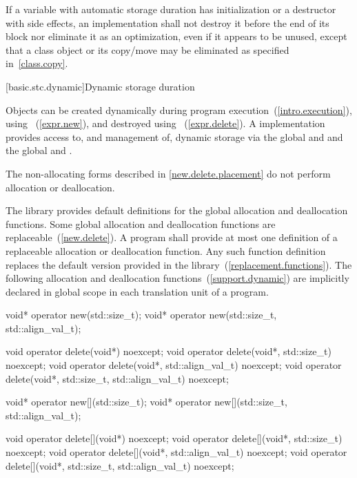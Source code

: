 \pnum
If a variable with automatic storage duration has initialization or a destructor with side
effects, an implementation shall not destroy it before the end of its block
nor eliminate it as an optimization, even if it appears to be
unused, except that a class object or its copy/move may be eliminated as
specified in~\ref{class.copy}.

[basic.stc.dynamic]{Dynamic storage duration}%

\pnum
Objects can be created dynamically during program
execution~(\ref{intro.execution}), using
%
~(\ref{expr.new}), and destroyed using
%
~(\ref{expr.delete}). A \Cpp implementation
provides access to, and management of, dynamic storage via the global
  and  and the global   and .
\begin{note}
The non-allocating forms described in \ref{new.delete.placement}
do not perform allocation or deallocation.
\end{note}

\pnum
The library provides default definitions for the global allocation and
deallocation functions. Some global allocation and deallocation
functions are replaceable~(\ref{new.delete}). A \Cpp program shall
provide at most one definition of a replaceable allocation or
deallocation function. Any such function definition replaces the default
version provided in the library~(\ref{replacement.functions}). The
following allocation and deallocation functions~(\ref{support.dynamic})
are implicitly declared in global scope in each translation unit of a
program.

\begin{codeblock}
void* operator new(std::size_t);
void* operator new(std::size_t, std::align_val_t);

void operator delete(void*) noexcept;
void operator delete(void*, std::size_t) noexcept;
void operator delete(void*, std::align_val_t) noexcept;
void operator delete(void*, std::size_t, std::align_val_t) noexcept;

void* operator new[](std::size_t);
void* operator new[](std::size_t, std::align_val_t);

void operator delete[](void*) noexcept;
void operator delete[](void*, std::size_t) noexcept;
void operator delete[](void*, std::align_val_t) noexcept;
void operator delete[](void*, std::size_t, std::align_val_t) noexcept;
\end{codeblock}

